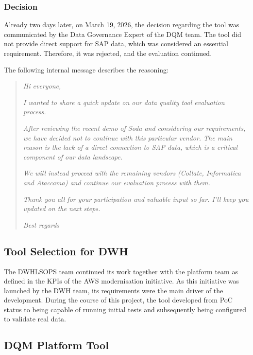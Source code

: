 \subsubsection*{Decision}

Already two days later, on March 19, 2026, the decision regarding the tool was communicated by the Data Governance Expert of the \gls{DQM} team. The tool did not provide direct support for SAP data, which was considered an essential requirement. Therefore, it was rejected, and the evaluation continued.

The following internal message describes the reasoning:

\begin{quote}
\textit{Hi everyone,}
 
\textit{I wanted to share a quick update on our data quality tool evaluation process.}
 
\textit{After reviewing the recent demo of Soda and considering our requirements, we have decided not to continue with this particular vendor. The main reason is the lack of a direct connection to SAP data, which is a critical component of our data landscape.}
 
\textit{We will instead proceed with the remaining vendors (Collate, Informatica and Ataccama) and continue our evaluation process with them.}
 
\textit{Thank you all for your participation and valuable input so far. I’ll keep you updated on the next steps.}
 

\textit{Best regards}
\end{quote}



\subsection*{Tool Selection for DWH}

The \gls{DWHLSOPS} team continued its work together with the platform team as defined in the KPIs of the AWS modernisation initiative. As this initiative was launched by the DWH team, its requirements were the main driver of the development. During the course of this project, the tool developed from \gls{PoC} status to being capable of running initial tests and subsequently being configured to validate real data.




\subsection*{DQM Platform Tool}

